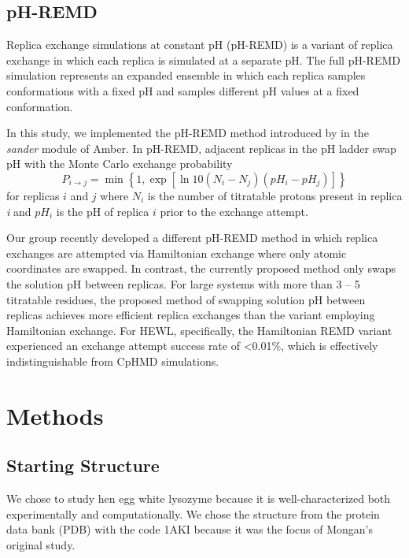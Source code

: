 \subsection{pH-REMD}

Replica exchange simulations at constant pH (pH-REMD) is a variant of replica
exchange in which each replica is simulated at a separate pH.  The full pH-REMD
simulation represents an expanded ensemble in which each replica samples
conformations with a fixed pH and samples different pH values at a fixed
conformation.

In this study, we implemented the pH-REMD method introduced by
\citeauthor{Itoh2011} \cite{Itoh2011} in the \emph{sander} module of Amber.
\cite{AMBER12}  In pH-REMD, adjacent replicas in the pH ladder swap pH with the
Monte Carlo exchange probability
\begin{equation}
   P _ {i \rightarrow j} = \min \left \lbrace 1, \exp \left[ \ln 10 \left( N _ i
            - N _ j \right) \left( pH_i - pH_j \right) \right] \right \rbrace
   \label{eq3:ExchSucc}
\end{equation}
for replicas $i$ and $j$ where $N_i$ is the number of titratable protons present
in replica \emph{i} and $pH_i$ is the pH of replica $i$ prior to the exchange
attempt.

Our group recently developed a different pH-REMD method in which replica
exchanges are attempted via Hamiltonian exchange where only atomic coordinates
are swapped. \cite{SabriDashti2012} In contrast, the currently proposed method
only swaps the solution pH between replicas.  For large systems with more than 3
-- 5 titratable residues, the proposed method of swapping solution pH between
replicas achieves more efficient replica exchanges than the variant employing
Hamiltonian exchange.  For HEWL, specifically, the Hamiltonian REMD variant
experienced an exchange attempt success rate of <0.01\%, which is effectively
indistinguishable from CpHMD simulations.

\section{Methods}

\subsection{Starting Structure}

We chose to study hen egg white lysozyme because it is well-characterized both
experimentally \cite{Takahashi1992, Bartik1994, Webb2011} and computationally.
\cite{Mongan2004,Demchuk1996,Wallace2011} We chose the structure from the
protein data bank (PDB) with the code 1AKI \cite{Artymiuk1982} because it was
the focus of Mongan's original study. \cite{Mongan2004}

